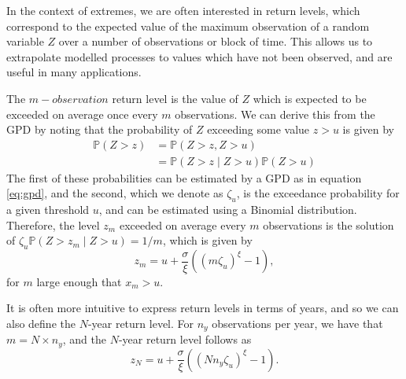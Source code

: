 \documentclass{article}
\numberwithin{equation}{section}
\begin{document}

In the context of extremes, we are often interested in return levels, which correspond to the expected value of the maximum observation of a random variable $Z$ over a number of observations or block of time.
This allows us to extrapolate modelled processes to values which have not been observed, and are useful in many applications.

The $m-observation$ return level is the value of $Z$ which is expected to be exceeded on average once every $m$ observations.
We can derive this from the GPD by noting that the probability of $Z$ exceeding some value $z > u$ is given by
\begin{align*}
  \mathbb{P}(Z > z) &= \mathbb{P}(Z > z, Z > u) \\
                    &= \mathbb{P}(Z > z \mid Z > u) \mathbb{P}(Z > u)
\end{align*}
The first of these probabilities can be estimated by a GPD as in equation \ref{eq:gpd}, and the second, which we denote as $\zeta_u$, is the exceedance probability for a given threshold $u$, and can be estimated using a Binomial distribution.
Therefore, the level $z_m$ exceeded on average every $m$ observations is the solution of 
$\zeta_u \mathbb{P}(Z > z_m \mid Z > u) = 1/m$, which is given by
\begin{equation} \label{eq:m_obs_return}
  z_m = u + \frac{\sigma}{\xi}\left(\left(m \zeta_u \right)^{\xi} - 1\right),
\end{equation}
for $m$ large enough that $x_m > u$. 

It is often more intuitive to express return levels in terms of years, and so we can also define the $N$-year return level.
For $n_y$ observations per year, we have that $m = N \times n_y$, and the $N$-year return level follows as
\begin{equation} \label{eq:n_year_return}
  z_N = u + \frac{\sigma}{\xi}\left(\left(N n_y \zeta_u \right)^{\xi} - 1\right). 
\end{equation}
\end{document}
